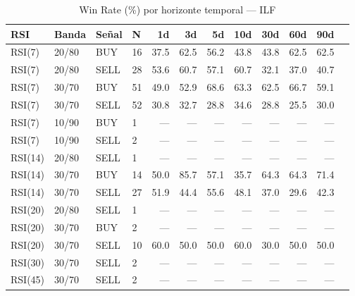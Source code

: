 %
\begin{table}[htbp]
    \centering
    \caption{Win Rate (\%) por horizonte temporal --- ILF}
    \label{tab:winrate_ilf}
    \small
    \begin{tabular}{llllrrrrrrrr}
        \toprule
        \textbf{RSI} & \textbf{Banda} & \textbf{Se\~{n}al} & \textbf{N} & \textbf{1d} & \textbf{3d} & \textbf{5d} & \textbf{10d} & \textbf{30d} & \textbf{60d} & \textbf{90d} \\
        \midrule
        RSI(7) & 20/80 & BUY & 16 & 37.5 & 62.5 & 56.2 & 43.8 & 43.8 & 62.5 & 62.5 \\
        RSI(7) & 20/80 & SELL & 28 & 53.6 & 60.7 & 57.1 & 60.7 & 32.1 & 37.0 & 40.7 \\
        RSI(7) & 30/70 & BUY & 51 & 49.0 & 52.9 & 68.6 & 63.3 & 62.5 & 66.7 & 59.1 \\
        RSI(7) & 30/70 & SELL & 52 & 30.8 & 32.7 & 28.8 & 34.6 & 28.8 & 25.5 & 30.0 \\
        RSI(7) & 10/90 & BUY & 1 & --- & --- & --- & --- & --- & --- & --- \\
        RSI(7) & 10/90 & SELL & 2 & --- & --- & --- & --- & --- & --- & --- \\
        \midrule
        RSI(14) & 20/80 & SELL & 1 & --- & --- & --- & --- & --- & --- & --- \\
        RSI(14) & 30/70 & BUY & 14 & 50.0 & 85.7 & 57.1 & 35.7 & 64.3 & 64.3 & 71.4 \\
        RSI(14) & 30/70 & SELL & 27 & 51.9 & 44.4 & 55.6 & 48.1 & 37.0 & 29.6 & 42.3 \\
        \midrule
        RSI(20) & 20/80 & SELL & 1 & --- & --- & --- & --- & --- & --- & --- \\
        RSI(20) & 30/70 & BUY & 2 & --- & --- & --- & --- & --- & --- & --- \\
        RSI(20) & 30/70 & SELL & 10 & 60.0 & 50.0 & 50.0 & 60.0 & 30.0 & 50.0 & 50.0 \\
        \midrule
        RSI(30) & 30/70 & SELL & 2 & --- & --- & --- & --- & --- & --- & --- \\
        \midrule
        RSI(45) & 30/70 & SELL & 2 & --- & --- & --- & --- & --- & --- & --- \\
        \bottomrule
    \end{tabular}
\end{table}
